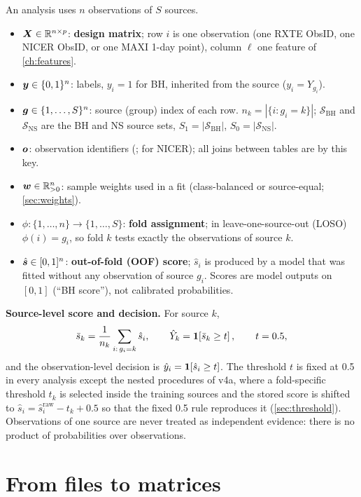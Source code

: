 An analysis uses $n$ observations of $S$ sources.
\begin{itemize}
\item $\bm{X}\in\mathbb{R}^{n\times p}$: \textbf{design matrix}; row $i$ is one observation (one RXTE ObsID, one NICER ObsID, or one
MAXI 1-day point), column $\ell$ one feature of \cref{ch:features}.
\item $\bm{y}\in\{0,1\}^n$: labels, $y_i=1$ for BH, inherited from the source ($y_i = Y_{g_i}$).
\item $\bm{g}\in\{1,\dots,S\}^n$: source (group) index of each row. $n_k = |\{i:g_i=k\}|$; $\mathcal{S}_\mathrm{BH}$ and
$\mathcal{S}_\mathrm{NS}$ are the BH and NS source sets, $S_1=|\mathcal{S}_\mathrm{BH}|$, $S_0=|\mathcal{S}_\mathrm{NS}|$.
\item $\bm{o}$: observation identifiers (;  for NICER); all joins between tables are by this key.
\item $\bm{w}\in\mathbb{R}_{>0}^n$: sample weights used in a fit (class-balanced or source-equal; \cref{sec:weights}).
\item $\phi:\{1,\dots,n\}\to\{1,\dots,S\}$: \textbf{fold assignment}; in leave-one-source-out (LOSO) $\phi(i)=g_i$, so fold
$k$ tests exactly the observations of source $k$.
\item $\hat{\bm{s}}\in[0,1]^n$: \textbf{out-of-fold (OOF) score}; $\hat s_i$ is produced by a model that was fitted without
any observation of source $g_i$. Scores are model outputs on $[0,1]$ (``BH score''), not calibrated probabilities.
\end{itemize}
\textbf{Source-level score and decision.} For source $k$,
\begin{equation}
\bar s_k = \frac{1}{n_k}\sum_{i:\,g_i=k}\hat s_i,\qquad \hat Y_k = \mathbf{1}\!\left[\bar s_k \ge t\right],\qquad t = 0.5, \label{eq:sourcescore}
\end{equation}
and the observation-level decision is $\hat y_i=\mathbf{1}\!\left[\hat s_i\ge t\right]$. The threshold $t$ is fixed at 0.5 in every analysis
except the nested procedures of v4a, where a fold-specific threshold $t_k$ is selected inside the training sources and the
stored score is shifted to $\hat s_i = \hat s_i^{\mathrm{raw}} - t_k + 0.5$ so that the fixed 0.5 rule reproduces it
(\cref{sec:threshold}). Observations of one source are never treated as independent evidence: there is no product of
probabilities over observations.

\section{From files to matrices}\label{sec:dm-recipe}

